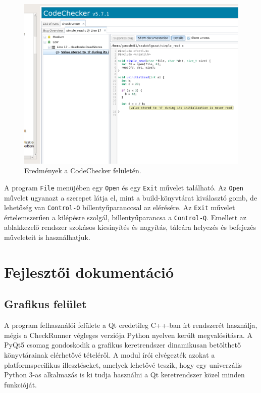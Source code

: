 \documentclass[a4paper,12pt]{report}
\begin{document}
\begin{figure}[h]
\caption{Eredmények a CodeChecker felületén.}
\centering
\includegraphics[scale=0.4]{ui_results_open.png}
\end{figure}

A program \texttt{File} menüjében egy \texttt{Open} és egy \texttt{Exit} művelet található. Az \texttt{Open} művelet ugyanazt a szerepet látja el, mint a build-könyvtárat kiválasztó gomb, de lehetőség van \texttt{Control-O} billentyűparanccsal az elérésére. Az \texttt{Exit} művelet értelemszerűen a kilépésre szolgál, billentyűparancsa a \texttt{Control-Q}. Emellett az ablakkezelő rendszer szokásos kicsinyítés és nagyítás, tálcára helyezés és befejezés műveleteit is használhatjuk.

\chapter{Fejlesztői dokumentáció}

\section{Grafikus felület}
A program felhasználói felülete a Qt \cite{qthomepage} eredetileg C++-ban írt rendszerét használja, mégis a CheckRunner végleges verziója Python nyelven került megvalósításra. A PyQt5 csomag gondoskodik a grafikus keretrendszer dinamikusan betölthető könyvtárainak elérhetővé tételéről. A modul írói elvégezték azokat a platformspecifikus illesztéseket, amelyek lehetővé teszik, hogy egy univerzális Python 3-as alkalmazás is ki tudja használni a Qt keretrendszer közel minden funkcióját.
\end{document}
